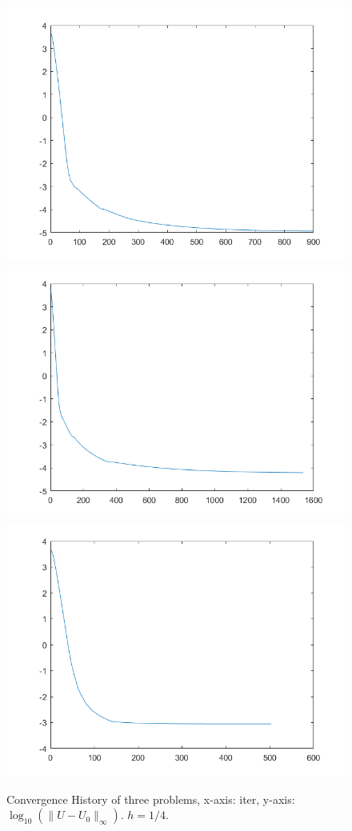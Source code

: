 \documentclass{article}
\begin{document}
\begin{figure}[H]
	\caption{Convergence History of three problems, x-axis: iter, y-axis: $\log_{10}(\|U-U_0\|_{\infty})$. $h = 1/4$.}
	\includegraphics[scale=.3]{../fig/q1_4.png}
	\includegraphics[scale=.3]{../fig/q2_4.png}
	\includegraphics[scale=.3]{../fig/q3_4.png}
\end{figure}
\end{document}
